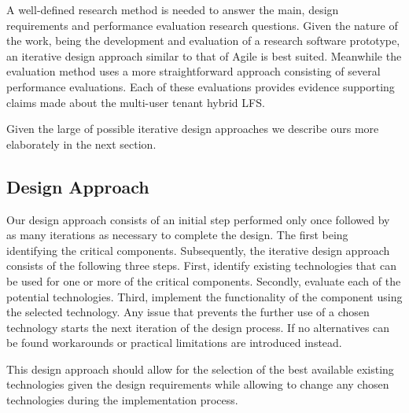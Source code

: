 A well-defined research method is needed to answer the main, design requirements
and performance evaluation research questions. Given the nature of the work,
being the development and evaluation of a research software prototype, an
iterative design approach similar to that of Agile is best suited. Meanwhile the
evaluation method uses a more straightforward approach consisting of several
performance evaluations. Each of these evaluations provides evidence supporting
claims made about the multi-user tenant hybrid LFS.

Given the large of possible iterative design approaches we describe ours
more elaborately in the next section.

\subsection{Design Approach}

Our design approach consists of an initial step performed only once followed by
as many iterations as necessary to complete the design. The first being
identifying the critical components. Subsequently, the iterative design approach
consists of the following three steps. First, identify existing technologies
that can be used for one or more of the critical components. Secondly,
evaluate each of the potential technologies. Third, implement the
functionality of the component using the selected technology. Any issue that
prevents the further use of a chosen technology starts the next iteration of the
design process. If no alternatives can be found workarounds or practical
limitations are introduced instead.

This design approach should allow for the selection of the best available
existing technologies given the design requirements while allowing to change
any chosen technologies during the implementation process.
